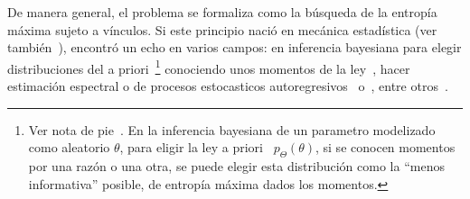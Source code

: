 De manera general, el problema se  formaliza como la b\'usqueda de la entrop\'ia
m\'axima  sujeto  a  v\'inculos.    Si  este  principio  naci\'o  en  mec\'anica
estad\'istica  (ver  tambi\'en~\cite{Jay57,   Jay57:2,  Jay65,  Mer10,  Mer18}),
encontr\'o  un  echo en  varios  campos:  en  inferencia bayesiana  para  elegir
distribuciones       del        a       priori~\footnote{Ver       nota       de
  pie~.  En la  inferencia bayesiana de un parametro
  modelizado  como   aleatorio  $\theta$,  para   eligir  la  ley  a   priori  \
  $p_\Theta(\theta)$,  si se conocen  momentos por  una raz\'on  o una  otra, se
  puede elegir esta distribuci\'on como la ``menos informativa'' posible, \ie de
  entrop\'ia  m\'axima dados  los  momentos.}  conociendo  unos  momentos de  la
ley~\cite{Rob07,  Jay68,  Jay82,  Csi91},  hacer  estimaci\'on  espectral  o  de
procesos     estocasticos      autoregresivos~\cite{Bur67,     Bur75,     Jay82}
o~\cite[cap.~12]{CovTho06}, entre otros~\cite[\& ref.]{Arn01, Kap89, KapKes92}.

